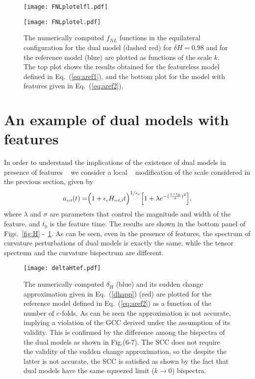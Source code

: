 \documentclass[aps,prl,amsmath,nofootinbib,twocolumn]{revtex4}
\newcommand{\3}{\partial}
\newcommand{\4}{\frac}
\newcommand{\5}{\delta}
\renewcommand\({\left(}
\renewcommand\){\right)}
\renewcommand\[{\left[}
\renewcommand\]{\right]}
\newcommand{\be}{\begin{equation}}
\newcommand{\ee}{\end{equation}}
\newcommand{\reff}{{\mbox{\tiny ref}}}
\newcommand{\eqn}[1]{(\ref{#1})}
\begin{document}
\begin{figure}
 \begin{minipage}{.45\textwidth}
  \texttt{[image: FNLplotelfl.pdf]}
  \end{minipage}
 \begin{minipage}{.45\textwidth}
  \texttt{[image: FNLplotel.pdf]}
 \end{minipage}
  \caption{The numerically computed $f_{NL}$ functions in the equilateral configuration for the dual model (dashed red) for $\delta H=0.98$ and for the reference model (blue) are plotted as functions of the scale $k$. The top plot shows the results obtained for the featureless model defined in Eq.~\eqn{eq:aref1}, and the bottom plot for the model with features given in Eq.~\eqn{eq:aref2}.
  }
\label{fig:FNLel}
\end{figure}

\section{An example of dual models with features}\label{edmf} 
In order to understand the implications of the existence of dual models in presence of features ~\cite{Starobinsky:1992ts, Adams2, Adams:2001vc,  Gariazzo:2014dla, Gariazzo:2015qea, Mooij:2015cxa, Ashoorioon:2006wc, Hazra:2014jwa,  Hazra:2016fkm, Cadavid:2015iya, Romano:2014kla, GallegoCadavid:2016wcz, GallegoCadavid:2015bsn, GallegoCadavid:2017pol, Palma:2014hra, pp, Arroja:2011yu, Chen:2011zf, Hazra:2014goa, Martin:2014kja, Cai:2015xla, Starobinsky:1998mj} we consider a local ~\cite{Cadavid:2015iya, GallegoCadavid:2016wcz}  modification of the scale considered in the previous section, given by
\be \label{eq:aref2}
a_{\reff}(t)= \Bigr(1+ \epsilon_{\mbox{\tiny c}} H_{\reff, i} t \Bigl)^{1/\epsilon_{\mbox{\tiny c}}}  \Bigr[1+ \lambda e^{-(\frac{t-t_0}{\sigma})^2} \Bigl],
\ee
where $\lambda$ and $\sigma$ are parameters that control the magnitude and width of the feature, and $t_0$ is the feature time. The results are shown in the bottom panel of Figs.~\ref{fig:H} -~\ref{fig:FNLel}. As can be seen, even in the presence of features, the spectrum of curvature perturbations of dual models is exactly the same, while the tensor spectrum and the curvature bispectrum are different.


\begin{figure}
 \texttt{[image: deltaHtef.pdf]}
 \caption{The numerically computed $\delta_H$  (blue) and its sudden change approximation given in  Eq.~\eqn{dhapp} (red)  are plotted for the reference model defined in Eq.~\eqn{eq:aref2} as a function of the number of $e$-folds. As can be seen the approximation is not accurate, implying a violation of the GCC derived under the assumption of its validity. This is confirmed by the difference among the bispectra of the dual  models as shown in Fig.(6-7). The SCC does not require the validity of the sudden change approximation, so the despite  the latter is not accurate,  the SCC is satisfied as shown by the fact that dual models  have the same squeezed limit ($k \rightarrow 0$) bispectra.}
\label{zppz}
\end{figure}
\end{document}
